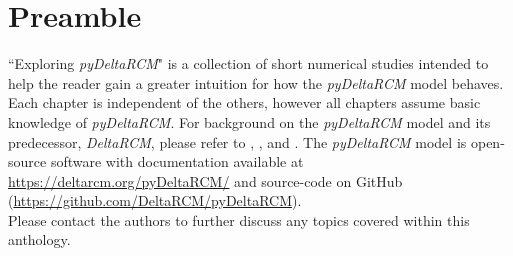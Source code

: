 \section{Preamble}
``Exploring \textit{pyDeltaRCM}" is a collection of short numerical studies intended to help the reader gain a greater intuition for how the \textit{pyDeltaRCM} model \cite{Moodie2021} behaves.
Each chapter is independent of the others, however all chapters assume basic knowledge of \textit{pyDeltaRCM}.
For background on the \textit{pyDeltaRCM} model and its predecessor, \textit{DeltaRCM}, please refer to \citet{Liang2015a}, \citet{Liang2015}, and \citet{Moodie2021}.
The \textit{pyDeltaRCM} model is open-source software with documentation available at \url{https://deltarcm.org/pyDeltaRCM/} and source-code on GitHub (\url{https://github.com/DeltaRCM/pyDeltaRCM}).\\

\noindent Please contact the authors to further discuss any topics covered within this anthology.

\clearpage

